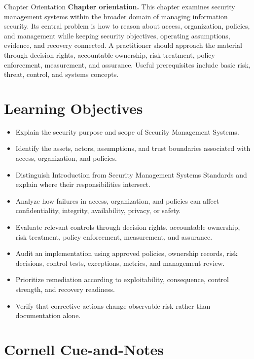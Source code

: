 \documentclass[11pt,letterpaper]{article}
\title{\CornellDocumentTitle}
\author{}
\date{}
\begin{document}
\maketitle
\begin{CornellOverviewBox}{Chapter Orientation}
\textbf{Chapter orientation.} This chapter examines security management systems within the broader domain of managing information security. Its central problem is how to reason about access, organization, policies, and management while keeping security objectives, operating assumptions, evidence, and recovery connected. A practitioner should approach the material through decision rights, accountable ownership, risk treatment, policy enforcement, measurement, and assurance. Useful prerequisites include basic risk, threat, control, and systems concepts.
\end{CornellOverviewBox}
\section*{Learning Objectives}
\begin{itemize}
\item Explain the security purpose and scope of Security Management Systems.
\item Identify the assets, actors, assumptions, and trust boundaries associated with access, organization, and policies.
\item Distinguish Introduction from Security Management Systems Standards and explain where their responsibilities intersect.
\item Analyze how failures in access, organization, and policies can affect confidentiality, integrity, availability, privacy, or safety.
\item Evaluate relevant controls through decision rights, accountable ownership, risk treatment, policy enforcement, measurement, and assurance.
\item Audit an implementation using approved policies, ownership records, risk decisions, control tests, exceptions, metrics, and management review.
\item Prioritize remediation according to exploitability, consequence, control strength, and recovery readiness.
\item Verify that corrective actions change observable risk rather than documentation alone.
\end{itemize}
\section*{Cornell Cue-and-Notes}
\end{document}
